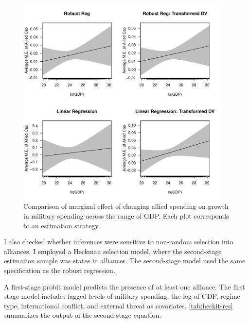 \documentclass[12pt]{article}
\begin{document}
\begin{figure}[htbp]
	\centering
		\includegraphics[width=0.95\textwidth]{me-plots.pdf}
	\caption{Comparison of marginal effect of changing allied spending on growth in military spending across the range of GDP. Each plot corresponds to an estimation strategy.}
	\label{fig:me-plots}
\end{figure}



I also checked whether inferences were sensitive to non-random selection into alliances. 
I employed a Heckman selection model, where the second-stage estimation sample was states in alliances. 
The second-stage model used the same specification as the robust regression.


A first-stage probit model predicts the presence of at least one alliance. 
The first stage model includes lagged levels of military spending, the log of GDP, regime type, international conflict, and external threat as covariates. 
\autoref{tab:heckit-res} summarizes the output of the second-stage equation.  
\end{document}
